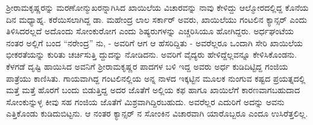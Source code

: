 ಶ‍್ರೀರಾಮಕೃಷ್ಣರನ್ನು ಮರಣೋನ್ಮುಖರನ್ನಾಗಿಸಿದ ಖಾಯಿಲೆಯ ವಿಚಾರವನ್ನು ನಾವು ಕೇಳಿದ್ದು ಆಲ್ಮೋರದಲ್ಲಿದ್ದ ಕೊನೆಯ ದಿನ ಮಧ್ಯಾಹ್ನ. ಕರೆಯಿಸಲಾಗಿದ್ದ ಡಾ. ಮಹೇಂದ್ರ ಲಾಲ ಸರ್ಕಾರ್ ಅವರು, ಖಾಯಿಲೆಯು ಗಂಟಲಿನ ಕ್ಯಾನ್ಸರ್ ಎಂದು ತಿಳಿಸಿದರಲ್ಲದೆ ಅದೊಂದು ಸೋಂಕುರೋಗ ಎಂದು ಶಿಷ್ಯರುಗಳನ್ನು ಎಚ್ಚರಿಸಿಯೂ ಹೋಗಿದ್ದರು. ಅರ್ಧಘಂಟೆಯ ನಂತರ ಅಲ್ಲಿಗೆ ಬಂದ “ನರೇಂದ್ರ” ನು, - ಅವರಿಗೆ ಆಗ ಆ ಹೆಸರಿದ್ದಿತು - ಅವರೆಲ್ಲರೂ ಒಂದಾಗಿ ಸೇರಿ ಖಾಯಿಲೆಯ ಭೀಕರತೆಯನ್ನು ಕುರಿತು ಚರ್ಚಿಸುತ್ತಿ ದ್ದುದನ್ನು ನೋಡಿದನು. ಅವರಿಗೆ ವೈದ್ಯರು ಹೇಳಿದ್ದೆಲ್ಲವನ್ನೂ ಕೇಳಿಸಿಕೊಂಡನು. ಕೆಳಗಡೆ ದೃಷ್ಟಿ ಹಾಯಿಸಿದ ಅವನಿಗೆ ಶ‍್ರೀರಾಮಕೃಷ್ಣರ ಪಾದಗಳ ಬಳಿ ಇದ್ದ ಅವರು ಅರ್ಧ ಕುಡಿದಿಟ್ಟಿದ್ದ ಗಂಜಿಯ ಪಾತ್ರೆಯು ಕಾಣಿಸಿತು. ಗಾಯವಾಗಿದ್ದ ಗಂಟಲಿನಲ್ಲಿಯ ಅನ್ನ ನಾಳದ ಇಕ್ಕಟ್ಟಿನ ಮೂಲಕ ನುಂಗುವ ಕಷ್ಟದ ಪ್ರಯತ್ನದಲ್ಲಿ ಮತ್ತೆ ಮತ್ತೆ ಹೊರಗೆ ಬಂದು ಬಿಡುತ್ತಿದ್ದ ಅದರ ಜೊತೆಗೆ ಅಲ್ಲಿಯ ಕಫ ಹಾಗೂ ಖಾಯಿಲೆಗೆ ಕಾರಣವಾಗಬಹುದಾದ ಸೋಂಕುನ್ನುಳ್ಳ ಕೀವು ಸಹ ಗಂಜಿಯ ಜೊತೆಗೆ ಮಿಶ್ರವಾಗಿದ್ದಿರಬಹುದು. ಅವರೆಲ್ಲರ ಎದುರಿಗೆ ಅದನ್ನು ಅವನು ಎತ್ತಿಕೊಂಡು ಕುಡಿದುಬಿಟ್ಟನು. ಆ ನಂತರ ಕ್ಯಾನ್ಸರ್ ನ ಸೋಂಕಿನ ವಿಚಾರವಾಗಿ ಯಾರೊಬ್ಬರೂ ಎಂದೂ ಉಸಿರೆತ್ತಲಿಲ್ಲ.

